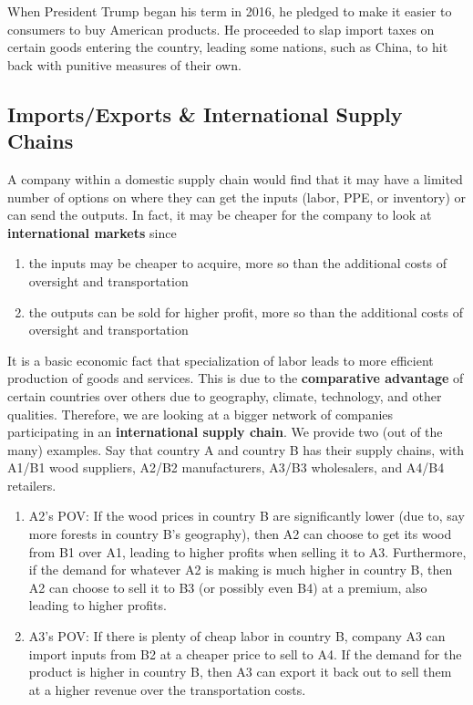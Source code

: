 \documentclass{article}
\begin{document}
  \begin{example}
    \label{ex:trump-vs-china}
    When President Trump began his term in 2016, he pledged to make it easier to consumers to buy American products. He proceeded to slap import taxes on certain goods entering the country, leading some nations, such as China, to hit back with punitive measures of their own. 
  \end{example}

  \subsection{Imports/Exports \& International Supply Chains}

    A company within a domestic supply chain would find that it may have a limited number of options on where they can get the inputs (labor, PPE, or inventory) or can send the outputs. In fact, it may be cheaper for the company to look at \textbf{international markets} since

    \begin{enumerate}
      \item the inputs may be cheaper to acquire, more so than the additional costs of oversight and transportation
      \item the outputs can be sold for higher profit, more so than the additional costs of oversight and transportation
    \end{enumerate}

    It is a basic economic fact that specialization of labor leads to more efficient production of goods and services. This is due to the \textbf{comparative advantage} of certain countries over others due to geography, climate, technology, and other qualities. Therefore, we are looking at a bigger network of companies participating in an \textbf{international supply chain}. We provide two (out of the many) examples. Say that country A and country B has their supply chains, with A1/B1 wood suppliers, A2/B2 manufacturers, A3/B3 wholesalers, and A4/B4 retailers.

    \begin{enumerate}
      \item A2's POV: If the wood prices in country B are significantly lower (due to, say more forests in country B's geography), then A2 can choose to get its wood from B1 over A1, leading to higher profits when selling it to A3. Furthermore, if the demand for whatever A2 is making is much higher in country B, then A2 can choose to sell it to B3 (or possibly even B4) at a premium, also leading to higher profits.
      \item A3's POV: If there is plenty of cheap labor in country B, company A3 can import inputs from B2 at a cheaper price to sell to A4. If the demand for the product is higher in country B, then A3 can export it back out to sell them at a higher revenue over the transportation costs.
    \end{enumerate}
\end{document}
